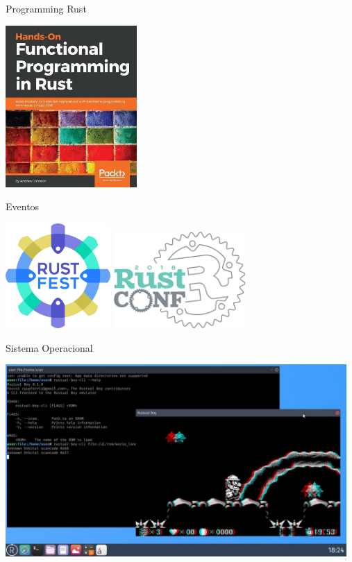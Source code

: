 \documentclass[aspectratio=169]{beamer}
\begin{document}
\begin{frame}{Programming Rust}
	\begin{center}
		\includegraphics[width=5.0cm]{imgs/hands-on-functional-programming-in-rust.jpg}	
	\end{center}
\end{frame}

\begin{frame}{Eventos}
	\begin{center}
		\includegraphics[width=4.0cm]{imgs/rustfest.png}
		\hspace{1cm}	
		\includegraphics[width=5.0cm]{imgs/rustconf.png}	
	\end{center}
\end{frame}

\begin{frame}{Sistema Operacional}
	\begin{center}
		\includegraphics[width=13.0cm]{imgs/redox.jpg}	
	\end{center}
\end{frame}
\end{document}
